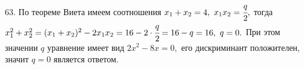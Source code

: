 63. По теореме Виета имеем соотношения $x_1+x_2=4,\ x_1x_2=\cfrac{q}{2},$ тогда $x_1^2+x_2^2=(x_1+x_2)^2-2x_1x_2=16-2\cdot\cfrac{q}{2}=16-q=16,\ q=0.$ При этом значении $q$ уравнение имеет вид $2x^2-8x=0,$ его дискриминант положителен, значит $q=0$ является ответом.\\
